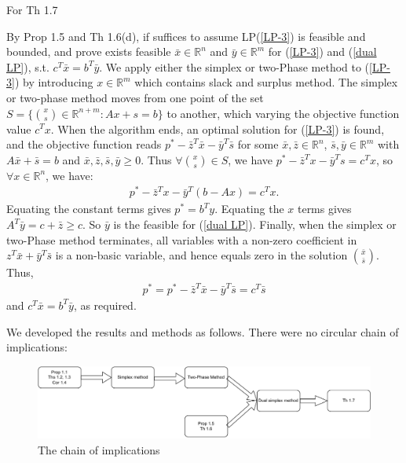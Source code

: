 \begin{solution}
    For Th 1.7

    By Prop 1.5 and Th 1.6(d), if suffices to assume LP(\ref{LP-3}) is feasible and bounded, and prove exists feasible $\bar{x}\in\mathbb{R}^n$ and $\bar{y}\in\mathbb{R}^m$ for (\ref{LP-3}) and (\ref{dual LP}), s.t. $c^T\bar{x} = b^T\bar{y}$. We apply either the simplex or two-Phase method to (\ref{LP-3}) by introducing $x\in\mathbb{R}^m$ which contains slack and surplus method. The simplex or two-phase method moves from one point of the set $S = \{ \binom{x}{s}\in\mathbb{R}^{n + m} : Ax + s = b\}$ to another, which varying the objective function value $c^Tx$. When the algorithm ends, an optimal solution for (\ref{LP-3}) is found, and the objective function reads $p^* - \bar{z}^T\bar{x} - \bar{y}^T\bar{s}$ for some $\bar{x}, \bar{z}\in\mathbb{R}^n$, $\bar{s}, \bar{y}\in\mathbb{R}^m$ with $A\bar{x} + \bar{s} = b$ and $\bar{x}, \bar{z}, \bar{s}, \bar{y}\ge 0$. Thus $\forall \binom{x}{s} \in S$, we have $p^*-\bar{z}^Tx-\bar{y}^Ts=c^Tx$, so $\forall x\in\mathbb{R}^n$, we have:
    \begin{align*}
        p^* - \bar{z}^T x - \bar{y}^T (b-Ax) = c^T x.
    \end{align*}
    Equating the constant terms gives $p^* = b^Ty$. Equating the $x$ terms gives $A^T\bar{y} = c+\bar{z}\ge c$. So $\bar{y}$ is the feasible for (\ref{dual LP}). Finally, when the simplex or two-Phase method terminates, all variables with a non-zero coefficient in $z^T\bar{x} +\bar{y}^T\bar{s}$ is a non-basic variable, and hence equals zero in the solution $\binom{\bar{x}}{\bar{s}}$. Thus,
    \begin{align*}
        p^* = p^* - \bar{z}^T\bar{x} - \bar{y}^T\bar{s} = c^T\bar{s}
    \end{align*}
    and $c^T\bar{x} = b^T\bar{y}$, as required.
\end{solution}
\begin{remark}
    We developed the results and methods as follows. There were no circular chain of implications:
    \begin{figure}[H]
        \centering
        \includegraphics[scale = 0.5]{drawio1.pdf}
        \caption{The chain of implications}
        \label{fig-2}
    \end{figure}
\end{remark}


